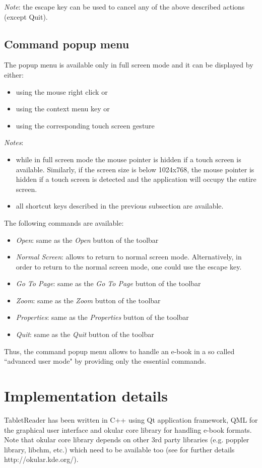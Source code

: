 \documentclass[journal,12pt]{IEEEtran}
\begin{document}
\textit{Note}: the escape key can be used to cancel any of the above described actions (except Quit).

\subsection{Command popup menu}
The popup menu is available only in full screen mode and it can be displayed by either:
\begin{itemize}
 \item using the mouse right click or
 \item using the context menu key or
 \item using the corresponding touch screen gesture
\end{itemize}

\textit{Notes}: 
\begin{itemize}
 \item while in full screen mode the mouse pointer is hidden if a touch screen is available. Similarly, if the screen size is below 1024x768, the mouse pointer is hidden if a touch screen is detected and the application will occupy the entire screen.
 \item all shortcut keys described in the previous subsection are available.
\end{itemize}

The following commands are available:
\begin{itemize}
 \item \textit{Open}: same as the \textit{Open} button of the toolbar
 \item \textit{Normal Screen}: allows to return to normal screen mode. Alternatively, in order to return to the normal screen mode, one could use the escape key.
 \item \textit{Go To Page}: same as the \textit{Go To Page} button of the toolbar
 \item \textit{Zoom}: same as the \textit{Zoom} button of the toolbar
 \item \textit{Properties}: same as the \textit{Properties} button of the toolbar
 \item \textit{Quit}: same as the \textit{Quit} button of the toolbar
\end{itemize}
Thus, the command popup menu allows to handle an e-book in a so called ``advanced user mode" by providing only the essential commands.

\section{Implementation details}
TabletReader has been written in C++ using Qt application framework, QML for the graphical user interface and okular core library for handling e-book formats. Note that okular core library depends on other 3rd party libraries (e.g. poppler library, libchm, etc.) which need to be available too (see for further details http://okular.kde.org/).
\end{document}
